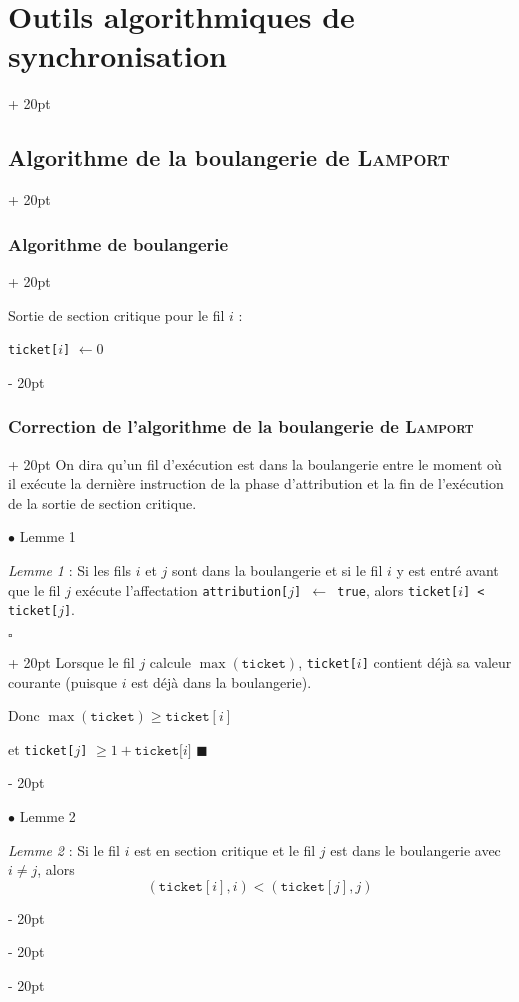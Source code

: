 \documentclass[a4paper, 12pt, twoside]{article}
\renewcommand{\ge}{\geqslant}
\newcommand{\ind}[1][20pt]{\advance\leftskip + #1}
\newcommand{\deind}[1][20pt]{\advance\leftskip - #1}
\newenvironment{indt}[2][20pt]{#2 \par \ind[#1]}{\par \deind} %
\newenvironment{proof}[1][{}]{\begin{indt}{$\square$ #1}}{$\blacksquare$ \end{indt}}
\begin{document}
\begin{indt}{\section{Outils algorithmiques de synchronisation}}
\begin{indt}{\subsection{Algorithme de la boulangerie de \textsc{Lamport}}}
\begin{indt}{\subsubsection{Algorithme de boulangerie}}
                \vspace{6pt}
                
                Sortie de section critique pour le fil $i$ :

                \begin{pseudocode}
                    \texttt{ticket[$i$]} $\leftarrow 0$
                \end{pseudocode}
            \end{indt}

            \vspace{12pt}
            
            \begin{indt}{\subsubsection{Correction de l'algorithme de la boulangerie de \textsc{Lamport}}}
                On dira qu'un fil d'exécution est dans la boulangerie entre le moment où il exécute la dernière instruction de la phase d'attribution et la fin de l'exécution de la sortie de section critique.

                $\bullet$ Lemme 1

                \begin{pseudocode}
                    \textit{Lemme 1} : Si les fils $i$ et $j$ sont dans la boulangerie et si le fil $i$ y est entré avant que le fil $j$ exécute l'affectation \texttt{attribution[$j$] $\leftarrow$ true}, alors \texttt{ticket[$i$] < ticket[$j$]}.
                \end{pseudocode}

                \begin{proof}
                    Lorsque le fil $j$ calcule $\max(\mathtt{ticket})$, \texttt{ticket[$i$]} contient déjà sa valeur courante (puisque $i$ est déjà dans la boulangerie).

                    Donc $\max(\mathtt{ticket}) \ge \mathtt{ticket}[i]$

                    et \texttt{ticket[$j$]} $\ge 1 + \mathtt{ticket[} i \mathtt ]$
                \end{proof}

                \vspace{12pt}
                
                $\bullet$ Lemme 2

                \begin{pseudocode}
                    \textit{Lemme 2} :
                    Si le fil $i$ est en section critique et le fil $j$ est dans le boulangerie avec $i \neq j$, alors
                    \[
                        (\mathtt{ticket}[i], i) < (\mathtt{ticket}[j], j)
                    \]
                \end{pseudocode}


\end{indt}
\end{indt}
\end{indt}
\end{document}
